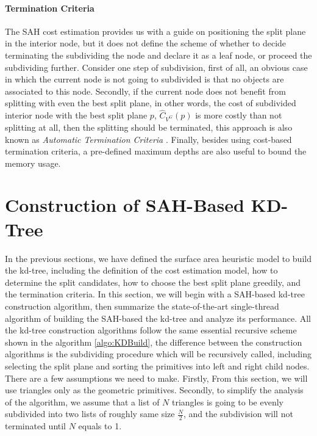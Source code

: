 \paragraph{Termination Criteria}
The SAH cost estimation provides us with a guide on positioning the split plane in the interior node, but it does not define the scheme of whether to decide terminating the subdividing the node and declare it as a leaf node, or proceed the subdividing further. Consider one step of subdivision, first of all, an obvious case in which the current node is not going to subdivided is that no objects are associated to this node. Secondly, if the current node does not benefit from splitting with even the best split plane, in other words, the cost of subdivided interior node with the best split plane \( p \), \(\hat{C}_{V^{G}}(p) \) is more costly than not splitting at all, then the splitting should be terminated, this approach is also known as \emph{ Automatic Termination Criteria }. Finally, besides using cost-based termination criteria, a pre-defined maximum depths are also useful to bound the memory usage. 


\section{Construction of SAH-Based KD-Tree}
In the previous sections, we have defined the surface area heuristic model to build the kd-tree, including the definition of the cost estimation model, how to determine the split candidates, how to choose the best split plane greedily, and the termination criteria. In this section, we will begin with a \mynaive SAH-based kd-tree construction algorithm, then summarize the state-of-the-art single-thread algorithm of building the SAH-based the kd-tree and analyze its performance. All the kd-tree construction algorithms follow the same essential recursive scheme shown in the algorithm \ref{algo:KDBuild}, the difference between the construction algorithms is the subdividing procedure which will be recursively called, including selecting the split plane and sorting the primitives into left and right child nodes. There are a few assumptions we need to make. Firstly, From this section, we will use triangles only as the geometric primitives. Secondly, to simplify the analysis of the algorithm, we assume that a list of \(N\) triangles is going to be evenly subdivided into two lists of roughly same size \(\frac{N}{2}\), and the subdivision will not terminated until \(N\) equals to 1.    

